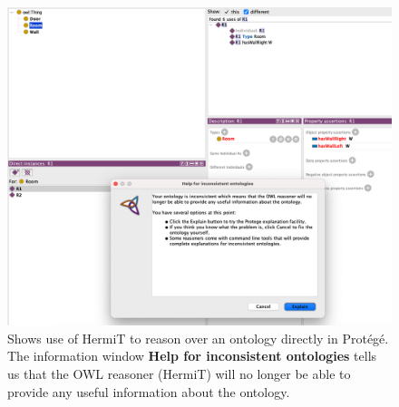 \documentclass{article}
\begin{document}
\begin{figure}[H]
    \centering
    \includegraphics[scale=0.32]{graphics/screenshot_ontology.png}
    \caption{Shows use of HermiT to reason over an ontology directly in Protégé. The information window \textbf{Help for inconsistent ontologies} tells us that the OWL reasoner (HermiT) will no longer be able to provide any useful information about the ontology.}
    \label{fig:hermit_in_protege}
\end{figure}
\end{document}
